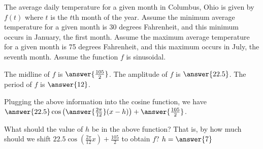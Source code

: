 \documentclass{ximera}
\author{Kenneth Berglund}
\begin{document}
\begin{exercise}
The average daily temperature for a given month in Columbus, Ohio is given by $f(t)$ where $t$ is the $t$th month of the year. Assume the minimum average temperature for a given month is 30 degrees Fahrenheit, and this minimum occurs in January, the first month. Assume the maximum average temperature for a given month is 75 degrees Fahrenheit, and this maximum occurs in July, the seventh month. Assume the function $f$ is sinusoidal. 

The midline of $f$ is $\answer{\frac{105}{2}}$. The amplitude of $f$ is $\answer{22.5}$. The period of $f$ is $\answer{12}$. 

\begin{exercise}
Plugging the above information into the cosine function, we have $\answer{22.5}\cos\left(\answer{\frac{2\pi}{12}}(x - h)\right) + \answer{\frac{105}{2}}$.

\begin{exercise}
What should the value of $h$ be in the above function? That is, by how much should we shift $22.5\cos\left(\frac{2\pi}{12}x \right) + \frac{105}{2}$ to obtain $f$? $h = \answer{7}$
\end{exercise}

\end{exercise}

\end{exercise}
\end{document}
